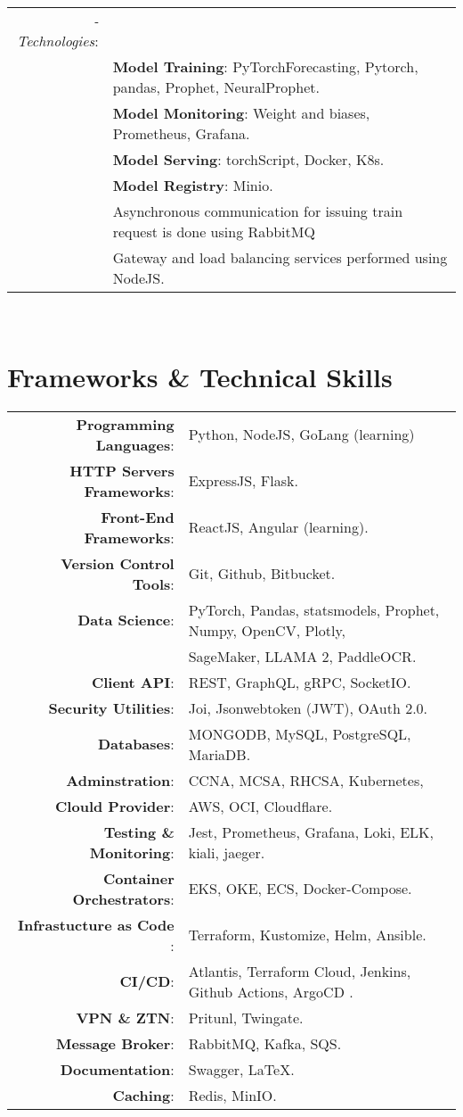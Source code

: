 \documentclass[a4paper,10pt]{article}
\begin{document}
\begin{tabular}{r|l}
    \textit{-Technologies}:\\&
     \textbf{Model Training}: PyTorchForecasting, Pytorch, pandas, Prophet, NeuralProphet. \\&
     \textbf{Model Monitoring}: Weight and biases, Prometheus, Grafana.\\&
     \textbf{Model Serving}: torchScript, Docker, K8s. \\&
     \textbf{Model Registry}: Minio. \\&
    Asynchronous communication for issuing train request is done using RabbitMQ \\&
    Gateway and load balancing services performed using NodeJS. 
\\
\end{tabular}
\\
\section{\textbf{Frameworks \& Technical Skills}}

\begin{longtable}{r p{16cm}}	
    \textbf{Programming Languages}:& Python, NodeJS, GoLang (learning)\\
    \textbf{HTTP Servers Frameworks}:& ExpressJS, Flask.\\
    \textbf{Front-End Frameworks}:& ReactJS, Angular (learning).\\
    \textbf{Version Control Tools}:& Git, Github, Bitbucket.\\
    \textbf{Data Science}:& PyTorch, Pandas, statsmodels, Prophet, Numpy, OpenCV, Plotly,\\
    & SageMaker, LLAMA 2, PaddleOCR.\\
    \textbf{Client API}:& REST, GraphQL, gRPC, SocketIO.\\
    \textbf{Security Utilities}:& Joi, Jsonwebtoken (JWT), OAuth 2.0.\\ 
    \textbf{Databases}:& MONGODB, MySQL, PostgreSQL, MariaDB.\\
    \textbf{Adminstration}:& CCNA, MCSA, RHCSA, Kubernetes,\\
    \textbf{Clould Provider}:& AWS, OCI, Cloudflare. \\
    \textbf{Testing \& Monitoring}:& Jest, Prometheus, Grafana, Loki, ELK, kiali, jaeger.\\ 
    \textbf{Container Orchestrators}:& EKS, OKE, ECS, Docker-Compose. \\
    \textbf{Infrastucture as Code }:& Terraform, Kustomize, Helm, Ansible.\\
    \textbf{CI/CD}:& Atlantis, Terraform Cloud, Jenkins, Github Actions, ArgoCD .\\
    \textbf{VPN \& ZTN}:& Pritunl, Twingate. \\
    \textbf{Message Broker}:& RabbitMQ, Kafka, SQS.\\
    \textbf{Documentation}:& Swagger, \LaTeX.\\
    \textbf{Caching}:& Redis, MinIO.\\
\end{longtable}
\end{document}
